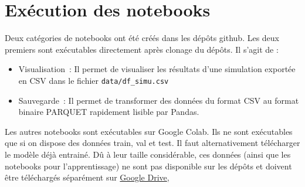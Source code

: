 \section{Exécution des notebooks}
Deux catégories de notebooks ont été créés dans les dépôts github. Les deux premiers sont exécutables directement après clonage du dépôts. Il s'agit de :
\begin{itemize}
 \item Visualisation : Il permet de visualiser les résultats d'une simulation exportée en CSV dans le fichier \verb|data/df_simu.csv|
 \item Sauvegarde : Il permet de transformer des données du format CSV au format binaire PARQUET rapidement lisible par Pandas.
\end{itemize}

Les autres notebooks sont exécutables sur Google Colab. Ils ne sont exécutables que si on dispose des données train, val et test. Il faut alternativement télécharger le modèle déjà entrainé. Dû à leur taille considérable, ces données (ainsi que les notebooks pour l'apprentissage) ne sont pas disponible sur les dépôts et doivent être téléchargés séparément sur \href{https://drive.google.com/drive/folders/1beYPm0n-GfyhcmAOO13HLm6GAQncAbTB?usp=sharing}{Google Drive}, 
